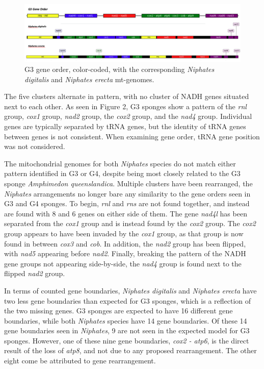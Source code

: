 \documentclass[../main.tex]{subfiles}
\begin{document}
\begin{figure}[htp]
    \centering
    \includegraphics[width=1.0\textwidth]{Figures/figure 4.png}
    \caption{G3 gene order, color-coded, with the corresponding \emph{Niphates digitalis} and \emph{Niphates erecta} mt-genomes.}
\end{figure}

The five clusters alternate in pattern, with no cluster of NADH genes situated next to each other. As seen in Figure 2, G3 sponges show a pattern of the \emph{rnl} group, \emph{cox1} group, \emph{nad2} group, the \emph{cox2} group, and the \emph{nad4} group. Individual genes are typically separated by tRNA genes, but the identity of tRNA genes between genes is not consistent. When examining gene order, tRNA gene position was not considered.

The mitochondrial genomes for both \emph{Niphates} species do not match either pattern identified in G3 or G4, despite being most closely related to the G3 sponge \emph{Amphimedon queenslandica}. Multiple clusters have been rearranged, the \emph{Niphates} arrangements no longer bare any similarity to the gene orders seen in G3 and G4 sponges. To begin, \emph{rnl} and \emph {rns} are not found together, and instead are found with 8 and 6 genes on either side of them. The gene \emph{nad4l} has been separated from the \emph{cox1} group and is instead found by the \emph{cox2} group. The \emph{cox2} group appears to have been invaded by the \emph{cox1} group, as that group is now found in between \emph{cox3} and \emph{cob}. In addition, the \emph{nad2} group has been flipped, with \emph{nad5} appearing before \emph{nad2}. Finally, breaking the pattern of the NADH gene groups not appearing side-by-side, the \emph{nad4} group is found next to the flipped \emph{nad2} group. 

In terms of counted gene boundaries, \emph{Niphates digitalis} and \emph{Niphates erecta} have two less gene boundaries than expected for G3 sponges, which is a reflection of the two missing genes. G3 sponges are expected to have 16 different gene boundaries, while both \emph{Niphates} species have 14 gene boundaries. Of these 14 gene boundaries seen in \emph{Niphates}, 9 are not seen in the expected model for G3 sponges. However, one of these nine gene boundaries, \emph{cox2 - atp6}, is the direct result of the loss of \emph{atp8}, and not due to any proposed rearrangement. The other eight come be attributed to gene rearrangement.
\end{document}

